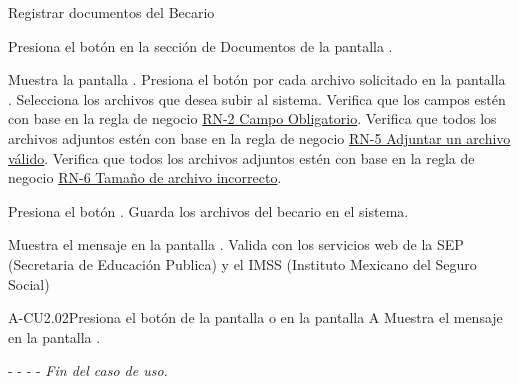 	\begin{UCtrayectoria}{Registrar documentos del Becario}
	
	   \UCpaso[\UCactor] Presiona el botón  en la sección de Documentos de la pantalla .

		\UCpaso[\UCsist] Muestra la pantalla . 
		\UCpaso[\UCactor] Presiona el botón  por cada archivo solicitado en la pantalla .
		\UCpaso[\UCactor] Selecciona los archivos que desea subir al sistema. 
		\UCpaso[\UCsist] Verifica que los campos estén con base en la regla de negocio \hyperlink{RN2}{RN-2 Campo Obligatorio}. 
		\UCpaso[\UCsist] Verifica que todos los archivos adjuntos estén con base en la regla de negocio \hyperlink{RN5}{RN-5 Adjuntar un archivo válido}. 
	    \UCpaso[\UCsist] Verifica que todos los archivos adjuntos estén con base en la regla de negocio \hyperlink{RN6}{RN-6 Tamaño de archivo incorrecto}. 
		
		\UCpaso[\UCactor] Presiona el botón . 
		\UCpaso[\UCsist] Guarda los archivos del becario en el sistema. 

		\UCpaso[\UCsist] Muestra el mensaje  en la pantalla .
		\UCpaso[\UCsist] Valida con los servicios web de la SEP (Secretaria de Educación Publica) y el IMSS (Instituto Mexicano del Seguro Social) %

		
	\end{UCtrayectoria}
	




	
	

	
	\begin{UCtrayectoriaA}{A-CU2.02}{Presiona el botón  de la pantalla  o en la pantalla }{A}
		\UCpaso[\UCsist] Muestra el mensaje  en la pantalla .
		\item[- -] - - {\em Fin del caso de uso.} 
	\end{UCtrayectoriaA}


